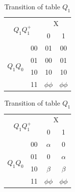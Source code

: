 \documentclass[pdftex,12pt,a4paper]{article}
\begin{document}
\begin{flushleft}
\begin{table}[h]
\centering
\begin{tabular}{cc|cc}
\multicolumn{2}{c|}{\multirow{2}{*}{$Q_{1}Q^{+}_{1}$}} & \multicolumn{2}{c}{X}   \\
\multicolumn{2}{c|}{}                                  & 0          & 1          \\ \hline
\multirow{4}{*}{$Q_{1}Q_{0}$}           & 00           & 01         & 00         \\
                                        & 01           & 00         & 01         \\
                                        & 10           & 10         & 10         \\
                                        & 11           & $\phi\phi$ & $\phi\phi$
\end{tabular}
\caption{Transition of table $Q_{1}$}
\label{tab:part2_q1}
\end{table}





\begin{table}[h]
\centering
\begin{tabular}{cc|cc}
\multicolumn{2}{c|}{\multirow{2}{*}{$Q_{1}Q^{+}_{1}$}} & \multicolumn{2}{c}{X}   \\
\multicolumn{2}{c|}{}                                  & 0          & 1          \\ \hline
\multirow{4}{*}{$Q_{1}Q_{0}$}           & 00           & $\alpha$   & 0          \\
                                        & 01           & 0          & $\alpha$   \\
                                        & 10           & $\beta$    & $\beta$    \\
                                        & 11           & $\phi\phi$ & $\phi\phi$
\end{tabular}
\caption{Transition of table $Q_{1}$}
\label{tab:part2_q1_2}
\end{table}




\newpage


\end{flushleft}
\end{document}
